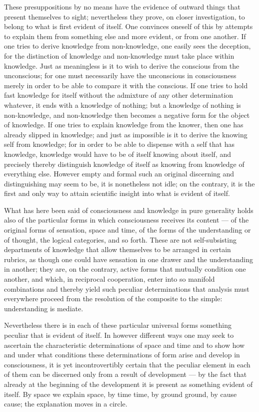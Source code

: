 \documentclass[12pt]{book}
\begin{document}
These presuppositions by no means have the evidence of outward things that
present themselves to sight; nevertheless they prove, on closer
investigation, to belong to what is first evident of itself. One convinces
oneself of this by attempts to explain them from something else and more
evident, or from one another. If one tries to derive knowledge from
non-knowledge, one easily sees the deception, for the distinction of
knowledge and non-knowledge must take place within knowledge. Just as
meaningless is it to wish to derive the conscious from the unconscious; for
one must necessarily have the unconscious in consciousness merely in order to
be able to compare it with the conscious. If one tries to hold fast knowledge
for itself without the admixture of any other determination whatever, it ends
with a knowledge of nothing; but a knowledge of nothing is non-knowledge,
and non-knowledge then becomes a negative form for the object of knowledge.
If one tries to explain knowledge from the knower, then one has already
slipped in knowledge; and just as impossible is it to derive the knowing self
from knowledge; for in order to be able to dispense with a self that has
knowledge, knowledge would have to be of itself knowing about itself, and
precisely thereby distinguish knowledge of itself as knowing from knowledge
of everything else. However empty and formal such an original discerning and
distinguishing may seem to be, it is nonetheless not idle; on the contrary,
it is the first and only way to attain scientific insight into what is
evident of itself.

What has here been said of consciousness and knowledge in pure generality
holds also of the particular forms in which consciousness receives its
content --- of the original forms of sensation, space and time, of the forms
of the understanding or of thought, the logical categories, and so forth.
These are not self-subsisting departments of knowledge that allow themselves
to be arranged in certain rubrics, as though one could have sensation in one
drawer and the understanding in another; they are, on the contrary, active
forms that mutually condition one another, and which, in reciprocal
cooperation, enter into so manifold combinations and thereby yield such
peculiar determinations that analysis must everywhere proceed from the
resolution of the composite to the simple: understanding is mediate.

Nevertheless there is in each of these particular universal forms something
peculiar that is evident of itself. In however different ways one may seek to
ascertain the characteristic determinations of space and time and to show how
and under what conditions these determinations of form arise and develop in
consciousness, it is yet incontrovertibly certain that the peculiar element
in each of them can be discerned only from a result of development --- by the
fact that already at the beginning of the development it is present as
something evident of itself. By space we explain space, by time time, by
ground ground, by cause cause; the explanation moves in a circle.
\end{document}
